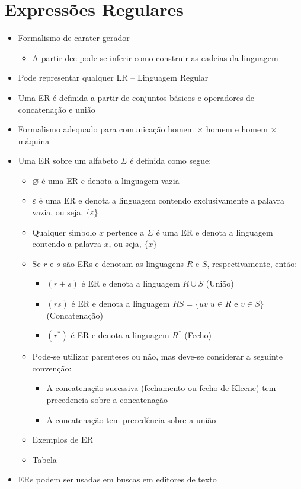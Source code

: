 \documentclass[12pt]{article}
\begin{document}
\section{Expressões Regulares}
\begin{itemize}
    \item Formalismo de carater gerador
    \begin{itemize}
        \item A partir dee pode-se inferir como construir as cadeias da linguagem
    \end{itemize}
    \item Pode representar qualquer LR -- Linguagem Regular
    \item Uma ER é definida a partir de conjuntos básicos e operadores de 
    concatenação e união 
    \item Formalismo adequado para comunicação homem $\times$ homem e homem 
    $\times$ máquina
    \item Uma ER sobre um alfabeto $\Sigma$ é definida como segue:
    \begin{itemize}
        \item $\varnothing$ é uma ER e denota a linguagem vazia
        \item $\varepsilon$ é uma ER e denota a linguagem contendo exclusivamente 
        a palavra vazia, ou seja, $\{\varepsilon\}$
        \item Qualquer simbolo $x$ pertence a $\Sigma$ é uma ER e denota a 
        linguagem contendo a palavra $x$, ou seja, $\{x\}$
        \item Se $r$ e $s$ são ERs e denotam as linguagens $R$ e $S$, 
        respectivamente, então:
        \begin{itemize}
            \item $(r+s)$ é ER e denota a linguagem $R \cup S$ (União)
            \item $(rs)$ é ER e denota a linguagem $RS=\{uv|u\in R \text{ e } 
            v \in S\}$ (Concatenação)
            \item $(r^*)$ é ER e denota a linguagem $R^*$ (Fecho)
        \end{itemize}
        \item Pode-se utilizar parenteses ou não, mas deve-se considerar a 
        seguinte convenção:
        \begin{itemize}
            \item A concatenação sucessiva (fechamento ou fecho de Kleene) tem 
            precedencia sobre a concatenação
            \item A concatenação tem precedência sobre a união
        \end{itemize}
        \item Exemplos de ER
        \item[] Tabela
    \end{itemize}
    \item ERs podem ser usadas em buscas em editores de texto

\end{itemize}
\end{document}
